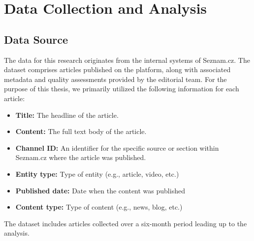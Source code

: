 
\chapter{Data Collection and Analysis\label{chap:data_collection}}

\section{Data Source}

The data for this research originates from the internal systems of Seznam.cz. The dataset comprises articles published on the platform, along with associated metadata and quality assessments provided by the editorial team. For the purpose of this thesis, we primarily utilized the following information for each article:

\begin{itemize}
  \item \textbf{Title:} The headline of the article.
  \item \textbf{Content:} The full text body of the article.
  \item \textbf{Channel ID:} An identifier for the specific source or section within Seznam.cz where the article was published.
  \item \textbf{Entity type: }Type of entity (e.g., article, video, etc.)
  \item \textbf{Published date:} Date when the content was published
  \item \textbf{Content type:} Type of content (e.g., news, blog, etc.)
\end{itemize}

The dataset includes articles collected over a six-month period leading up to the analysis.



